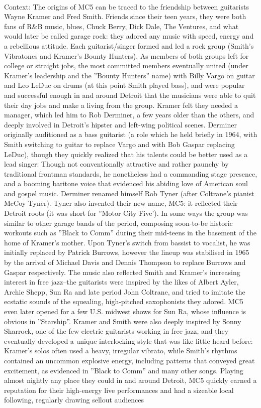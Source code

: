 \documentclass[11pt,a4paper, onecolumn]{article}
\begin{document}
\\ Context: The origins of MC5 can be traced to the friendship between guitarists Wayne Kramer and Fred Smith. Friends since their teen years, they were both fans of R&B music, blues, Chuck Berry, Dick Dale, The Ventures, and what would later be called garage rock: they adored any music with speed, energy and a rebellious attitude. Each guitarist/singer formed and led a rock group (Smith's Vibratones and Kramer's Bounty Hunters). As members of both groups left for college or straight jobs, the most committed members eventually united (under Kramer's leadership and the ''Bounty Hunters'' name) with Billy Vargo on guitar and Leo LeDuc on drums (at this point Smith played bass), and were popular and successful enough in and around Detroit that the musicians were able to quit their day jobs and make a living from the group. Kramer felt they needed a manager, which led him to Rob Derminer, a few years older than the others, and deeply involved in Detroit's hipster and left-wing political scenes. Derminer originally auditioned as a bass guitarist (a role which he held briefly in 1964, with Smith switching to guitar to replace Vargo and with Bob Gaspar replacing LeDuc), though they quickly realized that his talents could be better used as a lead singer: Though not conventionally attractive and rather paunchy by traditional frontman standards, he nonetheless had a commanding stage presence, and a booming baritone voice that evidenced his abiding love of American soul and gospel music. Derminer renamed himself Rob Tyner (after Coltrane's pianist McCoy Tyner). Tyner also invented their new name, MC5: it reflected their Detroit roots (it was short for ''Motor City Five'). In some ways the group was similar to other garage bands of the period, composing soon-to-be historic workouts such as ''Black to Comm'' during their mid-teens in the basement of the home of Kramer's mother. Upon Tyner's switch from bassist to vocalist, he was initially replaced by Patrick Burrows, however the lineup was stabilised in 1965 by the arrival of Michael Davis and Dennis Thompson to replace Burrows and Gaspar respectively. The music also reflected Smith and Kramer's increasing interest in free jazz--the guitarists were inspired by the likes of Albert Ayler, Archie Shepp, Sun Ra and late period John Coltrane, and tried to imitate the ecstatic sounds of the squealing, high-pitched saxophonists they adored. MC5 even later opened for a few U.S. midwest shows for Sun Ra, whose influence is obvious in ''Starship''. Kramer and Smith were also deeply inspired by Sonny Sharrock, one of the few electric guitarists working in free jazz, and they eventually developed a unique interlocking style that was like little heard before: Kramer's solos often used a heavy, irregular vibrato, while Smith's rhythms contained an uncommon explosive energy, including patterns that conveyed great excitement, as evidenced in ''Black to Comm'' and many other songs. Playing almost nightly any place they could in and around Detroit, MC5 quickly earned a reputation for their high-energy live performances and had a sizeable local following, regularly drawing sellout audiences 
\end{document}
